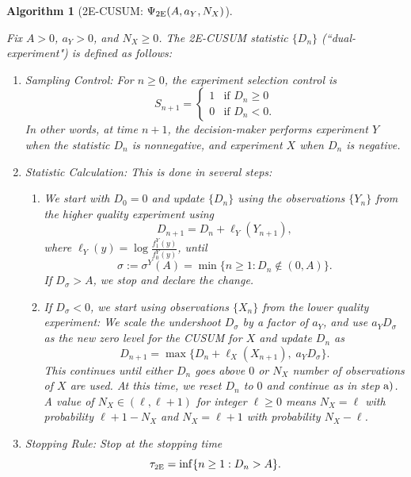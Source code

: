 \documentclass[journal, onecolumn]{IEEEtran}
\newtheorem{algorithm}{Algorithm}
\begin{document}
\begin{algorithm}[2E-CUSUM: $\Psi_{\textup{2E}} (A, a_Y, N_X)$]
\label{alg:2e-cusum}

Fix $A > 0$, $a_Y > 0$, and $N_X \geq 0$. The \textup{2E-CUSUM} statistic $\{ D_n \}$ (``dual-experiment") is defined as follows:

\begin{enumerate}
\item Sampling Control: For $n \geq 0$, the experiment selection control is
$$ S_{n + 1} =
\left\{
\begin{array}{ll}
1 & \text{if } D_n \geq 0 \\
0 & \text{if } D_n < 0.
\end{array}
\right. $$
In other words, at time $n + 1$, the decision-maker performs experiment $Y$ when the statistic $D_n$ is nonnegative, and experiment $X$ when $D_n$ is negative.

\item Statistic Calculation: This is done in several steps:

    \begin{enumerate}
    \item We start with $D_0 = 0$ and update $\{ D_n \}$ using the observations $\{ Y_n \}$ from the higher quality experiment using
    $$ D_{n + 1}  = D_n + \ell_Y (Y_{n + 1}), $$
    where $\ell_Y (y) = \log \frac{f_1^Y (y)}{f_0^Y (y)}$, until 
    $$ \sigma := \sigma^Y (A) = \min \{ n \geq 1: D_n \notin (0, A) \}. $$
    If $D_\sigma > A$, we stop and declare the change.

    \item If $D_\sigma < 0$, we start using observations $\{ X_n \}$ from the lower quality experiment: We scale the undershoot $D_\sigma$ by a factor of $a_Y$, and use $a_Y D_\sigma$ as the new zero level for the \textup{CUSUM} for $X$ and update $D_n$ as
    $$ D_{n + 1} = \max \{ D_n + \ell_X (X_{n + 1}), \; a_Y D_\sigma \}. $$
    This continues until either $D_n$ goes above $0$ or $N_X$ number of observations of $X$ are used. At this time, we reset $D_n$ to $0$ and continue as in step $\textup{a)}$.  A value of $N_X \in (\ell, \ell + 1)$ for integer $\ell \geq 0$ means $N_X = \ell$ with probability $\ell +1 - N_X$ and $N_X = \ell + 1$ with probability $N_X-\ell$.  
    \end{enumerate}

\item Stopping Rule: Stop at the stopping time
$$ \tau_{\textup{\fontsize{6 pt}{10 pt}\selectfont 2E}} = \inf \{ n \geq 1: D_n > A \}. $$
\end{enumerate}    
\end{algorithm}
\end{document}
